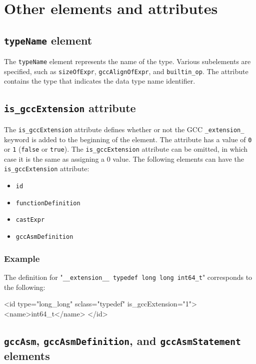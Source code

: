 \section{Other elements and attributes}

\subsection{ {\tt typeName} element}

The {\tt typeName} element represents the name of the type. Various subelements are specified, such as {\tt sizeOfExpr}, {\tt gccAlignOfExpr}, and {\tt builtin\_op}. The attribute contains the type that indicates the data type name identifier.

\subsection{ {\tt is\_gccExtension} attribute}

The {\tt is\_gccExtension} attribute defines whether or not the GCC {\tt \_extension\_} keyword is added to the beginning of the element. The attribute has a value of {\tt 0} or {\tt 1} ({\tt false} or {\tt true}). The {\tt is\_gccExtension} attribute can be omitted, in which case it is the same as assigning a 0 value. The following elements can have the {\tt is\_gccExtension} attribute:

\begin{itemize}
\item {\tt id}
\item {\tt functionDefinition}
\item {\tt castExpr}
\item {\tt gccAsmDefinition}
\end{itemize}

\subsubsection*{Example}

The definition for "{\tt \_\_extension\_\_ typedef long long int64\_t}" corresponds to the following:
\vspace{2mm}

\begin{XcodeMLExample}
 <id type="long_long" sclass="typedef" is_gccExtension="1">
   <name>int64_t</name>
 </id>
\end{XcodeMLExample}

\subsection{ {\tt gccAsm}, {\tt gccAsmDefinition}, and {\tt gccAsmStatement} elements}

